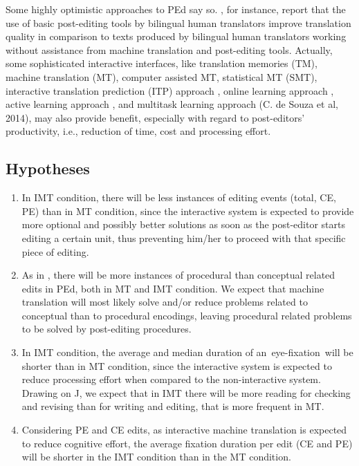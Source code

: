 \documentclass[output=paper]{langsci/langscibook}
\begin{document}
Some highly optimistic approaches to PEd say so. \citet{Green2013}, for instance, report that the use of basic post-editing tools by bilingual human translators improve translation quality in comparison to texts produced by bilingual human translators working without assistance from machine translation and post-editing tools. Actually, some sophisticated interactive interfaces, like translation memories (TM), machine translation (MT), computer assisted MT, statistical MT (SMT), interactive translation prediction (ITP) approach \citep{langlais2002, casacuberta2009, Barrachina2009}, online learning approach \citep{OrtizMartinez2010}, active learning approach \citep{gonzalez2014cost}, and multitask learning approach (C. de Souza et al, 2014), may also provide benefit, especially with regard to post-editors’ productivity, i.e., reduction of time, cost and processing effort.


\subsection{Hypotheses}

\begin{enumerate}
\item In IMT condition, there will be less instances of editing events (total, CE, PE) than in MT condition, since the interactive system is expected to provide more optional and possibly better solutions as soon as the post-editor starts editing a certain unit, thus preventing him/her to proceed with that specific piece of editing.
\item As in \citet{alves2013}, there will be more instances of procedural than conceptual related edits in PEd, both in MT and IMT condition. We expect that machine translation will most likely solve and/or reduce problems related to conceptual than to procedural encodings, leaving procedural related problems to be solved by post-editing procedures.
\item In IMT condition, the average and median duration of an~eye-fixation~will be shorter than in MT condition, since the interactive system is expected to reduce processing effort when compared to the non-interactive system. Drawing on J\citet{jakobsen2008}, we expect that in IMT there will be more reading for checking and revising than for writing and editing, that is more frequent in MT.
\item Considering PE and CE edits, as interactive machine translation is expected to reduce cognitive effort, the average fixation duration per edit (CE and PE) will be shorter in the IMT condition than in the MT condition.
\end{enumerate}
\end{document}
